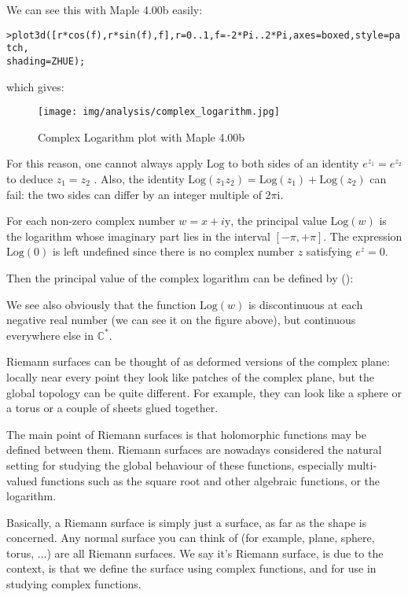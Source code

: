 	We can see this with Maple 4.00b easily:
	
	\texttt{>plot3d([r*cos(f),r*sin(f),f],r=0..1,f=-2*Pi..2*Pi,axes=boxed,style=patch,\\
	shading=ZHUE);}
	
	which gives:
	\begin{figure}[H]
		\begin{center}
			\texttt{[image: img/analysis/complex\_logarithm.jpg]}
		\end{center}	
		\caption{Complex Logarithm plot with Maple 4.00b}
	\end{figure}
	
	For this reason, one cannot always apply $\text{Log}$ to both sides of an identity $e^{z_1}=e^{z_2}$ to deduce $z_1=z_2$ . Also, the identity $\text{Log} (z_1z_2)= \text{Log}(z_1) + \text{Log}(z_2)$ can fail: the two sides can differ by an integer multiple of $2\pi \mathrm{i}$.
	
	For each non-zero complex number $w = x + i\mathrm{y}$, the principal value $\text{Log}(w)$ is the logarithm whose imaginary part lies in the interval $[-\pi,+\pi]$. The expression $\text{Log}(0)$ is left undefined since there is no complex number $z$ satisfying $e^z = 0$.
	
	Then the principal value of the complex logarithm can be defined by ():
	
	We see also obviously that the function $\text{Log}(w)$ is discontinuous at each negative real number (we can see it on the figure above), but continuous everywhere else in $\mathbb{C}^*$.
	
	Riemann surfaces can be thought of as deformed versions of the complex plane: locally near every point they look like patches of the complex plane, but the global topology can be quite different. For example, they can look like a sphere or a torus or a couple of sheets glued together.
	
	The main point of Riemann surfaces is that holomorphic functions may be defined between them. Riemann surfaces are nowadays considered the natural setting for studying the global behaviour of these functions, especially multi-valued functions such as the square root and other algebraic functions, or the logarithm.
	
	Basically, a Riemann surface is simply just a surface, as far as the shape is concerned. Any normal surface you can think of (for example, plane, sphere, torus, ...) are all Riemann surfaces. We say it's Riemann surface, is due to the context, is that we define the surface using complex functions, and for use in studying complex functions.
	
